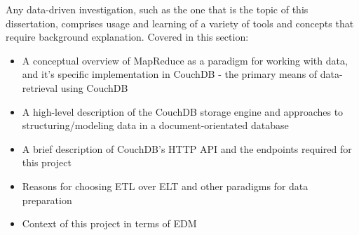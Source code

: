Any data-driven investigation, such as the one that is the topic of this dissertation, comprises usage and learning of a variety of tools and concepts that require background explanation. Covered in this section:

\begin{itemize}
    \item A conceptual overview of MapReduce as a paradigm for working with data, and it's specific implementation in CouchDB - the primary means of data-retrieval using CouchDB
    \item A high-level description of the CouchDB storage engine and approaches to structuring/modeling data in a document-orientated database
    \item A brief description of CouchDB's HTTP API and the endpoints required for this project
    \item Reasons for choosing ETL over ELT and other paradigms for data preparation
    \item Context of this project in terms of EDM
\end{itemize}